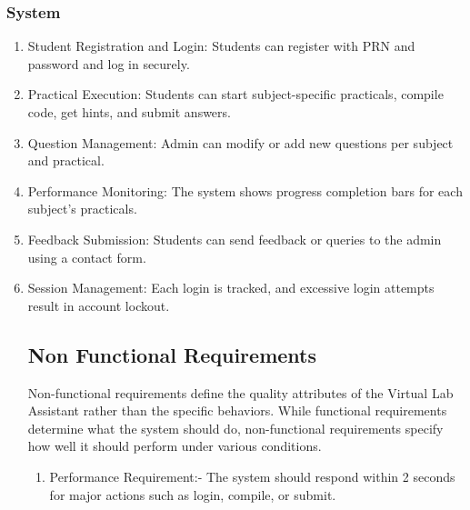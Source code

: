 \subsubsection{\textbf{System}}
\begin{enumerate}
  

   \item 	Student Registration and Login:
Students can register with PRN and password and log in securely.
    \item	Practical Execution:
Students can start subject-specific practicals, compile code, get hints, and submit answers.
   
    \item	Question Management:
Admin can modify or add new questions per subject and practical.
    \item	Performance Monitoring:
The system shows progress completion bars for each subject’s practicals.
    \item	Feedback Submission:
Students can send feedback or queries to the admin using a contact form.
    \item	Session Management:
Each login is tracked, and excessive login attempts result in account lockout.

\newpage
\subsection{Non Functional Requirements}
Non-functional requirements define the quality attributes of the Virtual Lab Assistant rather than the specific behaviors.
While functional requirements determine what the system should do, non-functional requirements specify how well it should perform under various conditions.
\begin{enumerate}
    \item Performance Requirement:- The system should respond within 2 seconds for major actions such as login, compile, or submit.


\end{enumerate}
\end{enumerate}
